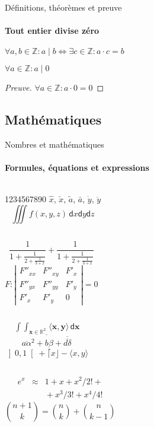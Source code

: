 \documentclass{beamer}
\begin{document}
\begin{frame}[label=proof]{Définitions, théorèmes et preuve}
\framesubtitle{Tout entier divise zéro}
\begin{definition}
$\forall a,b\in\mathbb{Z}: a\mid b\iff\exists c\in\mathbb{Z}:a\cdot c=b$
\end{definition}
\begin{theorem}
$\forall a\in\mathbb{Z}: a\mid 0$
\end{theorem}
\begin{proof}[Preuve\nopunct]
$\forall a\in\mathbb{Z}: a\cdot 0=0$
\end{proof}
\end{frame}


\subsection{Mathématiques}
\begin{frame}[label=math]{Nombres et mathématiques}
\framesubtitle{Formules, équations et expressions}
\begin{columns}[onlytextwidth]
    1234567890
    $\hat{x}$, $\check{x}$, $\tilde{a}$,
    $\bar{a}$, $\dot{y}$, $\ddot{y}$
    $$ \iiint f(x,y,z)\,\mathsf{d}x\mathsf{d}y\mathsf{d}z$$
\end{columns}
\begin{columns}[onlytextwidth]
    $$\frac{1}{\displaystyle 1+
    \frac{1}{\displaystyle 2+
    \frac{1}{\displaystyle 3+x}}} +
    \frac{1}{1+\frac{1}{2+\frac{1}{3+x}}}$$
    $$F:\left| \begin{array}{ccc}
    F''_{xx} & F''_{xy} &  F'_x \\
    F''_{yx} & F''_{yy} &  F'_y \\
    F'_x     & F'_y     & 0
    \end{array}\right| = 0$$
\end{columns}
\begin{columns}[onlytextwidth]
    $$\mathop{\int \!\!\! \int}_{\mathbf{x} \in \mathbb{R}^2}
    \! \langle \mathbf{x},\mathbf{y}\rangle\,\mathsf{d}\mathbf{x}$$
    $$\overline{\overline{a\alpha}^2+\underline{b\beta}
    +\overline{\overline{d\delta}}}$$
    $\left] 0,1\right[ + \lceil x \rfloor - \langle x,y\rangle$
\end{columns}
\begin{columns}[onlytextwidth]
    \begin{eqnarray*}
    e^x &\approx& 1+x+x^2/2! + \\
        && {}+x^3/3! + x^4/4!
    \end{eqnarray*}
    $${n+1\choose k} = {n\choose k} + {n \choose k-1}$$
\end{columns}
\end{frame}
\end{document}
